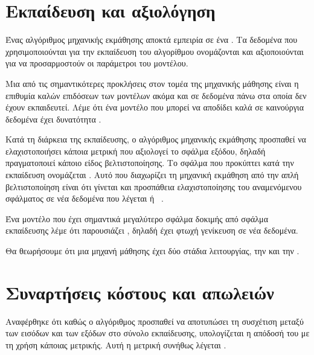 \section{Εκπαίδευση και αξιολόγηση}
Ένας αλγόριθμος μηχανικής εκμάθησης αποκτά εμπειρία σε ένα .
Τα δεδομένα που χρησιμοποιούνται για την εκπαίδευση του αλγορίθμου ονομάζονται  και αξιοποιούνται για να προσαρμοστούν οι παράμετροι του μοντέλου.

Μια από τις σημαντικότερες προκλήσεις στον τομέα της μηχανικής μάθησης είναι η επιθυμία καλών επιδόσεων των μοντέλων ακόμα και σε δεδομένα πάνω στα οποία δεν έχουν εκπαιδευτεί.
Λέμε ότι ένα μοντέλο που μπορεί να αποδίδει καλά σε καινούργια δεδομένα έχει δυνατότητα .

Κατά τη διάρκεια της εκπαίδευσης, ο αλγόριθμος μηχανικής εκμάθησης προσπαθεί να ελαχιστοποιήσει κάποια μετρική που αξιολογεί το σφάλμα εξόδου, δηλαδή πραγματοποιεί κάποιο είδος βελτιστοποίησης.
Το σφάλμα που προκύπτει κατά την εκπαίδευση ονομάζεται .
Αυτό που διαχωρίζει τη μηχανική εκμάθηση από την απλή βελτιστοποίηση είναι ότι γίνεται και προσπάθεια ελαχιστοποίησης του αναμενόμενου σφάλματος σε νέα δεδομένα που
λέγεται  ή ~\cite{goodfellow}.

Ένα μοντέλο που έχει σημαντικά μεγαλύτερο σφάλμα δοκιμής από σφάλμα εκπαίδευσης λέμε ότι παρουσιάζει ,
δηλαδή έχει φτωχή γενίκευση σε νέα δεδομένα.

Θα θεωρήσουμε ότι μια μηχανή μάθησης έχει δύο στάδια λειτουργίας, την  και την .

\section{Συναρτήσεις κόστους και απωλειών}
Αναφέρθηκε ότι καθώς ο αλγόριθμος προσπαθεί να αποτυπώσει τη συσχέτιση μεταξύ των εισόδων και των εξόδων στο σύνολο εκπαίδευσης, υπολογίζεται η απόδοσή του με τη χρήση κάποιας μετρικής.
Αυτή η μετρική συνήθως λέγεται .

